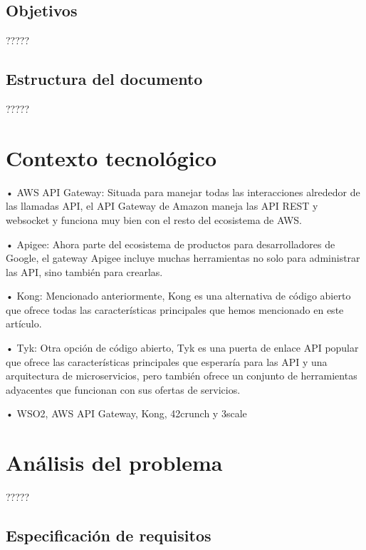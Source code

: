 \documentclass[11pt,spanish,listoffigures]{tfgetsinf}
\begin{document}
\section{Objetivos}

?????

\section{Estructura del documento}

?????


\chapter{Contexto tecnológico}

•	AWS API Gateway: Situada para manejar todas las interacciones alrededor de las llamadas API, el API Gateway de Amazon maneja las API REST y websocket y funciona muy bien con el resto del ecosistema de AWS.

•	Apigee: Ahora parte del ecosistema de productos para desarrolladores de Google, el gateway Apigee incluye muchas herramientas no solo para administrar las API, sino también para crearlas.

•	Kong: Mencionado anteriormente, Kong es una alternativa de código abierto que ofrece todas las características principales que hemos mencionado en este artículo.

•	Tyk: Otra opción de código abierto, Tyk es una puerta de enlace API popular que ofrece las características principales que esperaría para las API y una arquitectura de microservicios, pero también ofrece un conjunto de herramientas adyacentes que funcionan con sus ofertas de servicios.

•	WSO2, AWS API Gateway, Kong, 42crunch y 3scale



\chapter{Análisis del problema}

?????

\section{Especificación de requisitos}
\end{document}

